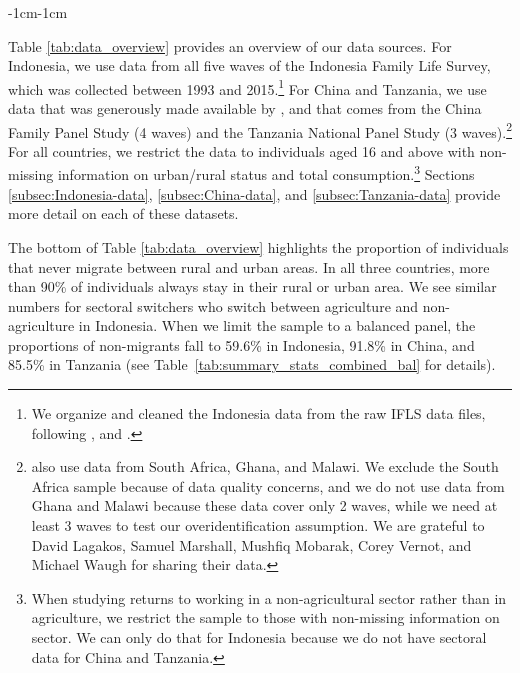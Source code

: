 \documentclass[12pt]{article}
\begin{document}
\begin{table}[htbp]
    \begin{adjustwidth}{-1cm}{-1cm}
        \centering
        
        \caption{Overview of Data Sources}\label{tab:data_overview}
    \end{adjustwidth}
\end{table}

Table \ref{tab:data_overview} provides an overview of our data sources. For Indonesia, we use data from all five waves of the Indonesia Family Life Survey, which was collected between 1993 and 2015.\footnote{We organize and cleaned the Indonesia data from the raw IFLS data files, following \cite{kleemansLabourMarketResponses2018}, \cite{hamoryReevaluatingAgriculturalProductivity2021} and \cite{kleemansMigrationChoiceRisk}.} For China and Tanzania, we use data that was generously made available by \cite{lagakosMigrationCostsObservational2020}, and that comes from the China Family Panel Study (4 waves) and the Tanzania National Panel Study (3 waves).\footnote{\cite{lagakosMigrationCostsObservational2020} also use data from South Africa, Ghana, and Malawi. We exclude the South Africa sample because of data quality concerns, and we do not use data from Ghana and Malawi because these data cover only 2 waves, while we need at least 3 waves to test our overidentification assumption. We are grateful to David Lagakos, Samuel Marshall, Mushfiq Mobarak, Corey Vernot, and Michael Waugh for sharing their data.}
For all countries, we restrict the data to individuals aged 16 and above with non-missing information on urban/rural status and total consumption.\footnote{When studying returns to working in a non-agricultural sector rather than in agriculture, we restrict the sample to those with non-missing information on sector. We can only do that for Indonesia because we do not have sectoral data for China and Tanzania.} Sections \ref{subsec:Indonesia-data}, \ref{subsec:China-data}, and \ref{subsec:Tanzania-data} provide more detail on each of these datasets. 

The bottom of Table \ref{tab:data_overview} highlights the proportion of individuals that never migrate between rural and urban areas. In all three countries, more than 90\% of individuals always stay in their rural or urban area.
We see similar numbers for sectoral switchers who switch between agriculture and non-agriculture in Indonesia.
When we limit the sample to a balanced panel, the proportions of non-migrants fall to 59.6\% in Indonesia, 91.8\% in China, and 85.5\% in Tanzania (see Table~\ref{tab:summary_stats_combined_bal} for details). 
\end{document}
